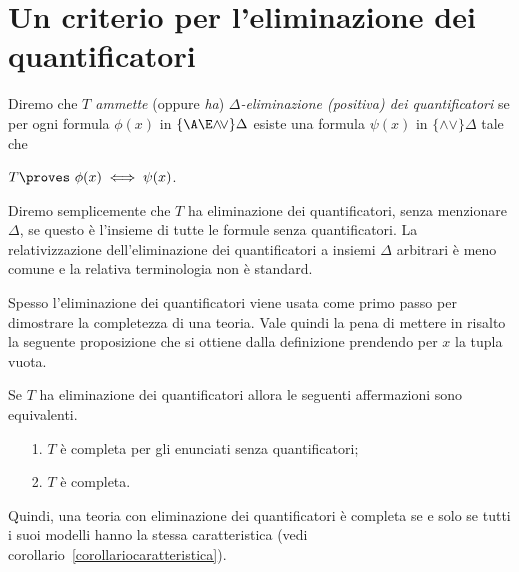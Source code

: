 \section{Un criterio per l'eliminazione dei quantificatori}
\label{eliminazionequantificatoricriterio}

Diremo che \emph{$T$ ammette\/} (oppure \emph{ha\/}) \emph{$\Delta$-eliminazione (positiva) dei quantificatori\/} se per ogni formula $\phi(x)$ in $\{\A\E\mathord\wedge\!\mathord\vee\}\Delta$ esiste una formula $\psi(x)$ in $\{\mathord\wedge\!\mathord\vee\}\Delta$ tale che

\hfil$\displaystyle T\proves\ \phi(x)\iff\psi(x)$.

Diremo semplicemente che $T$ ha eliminazione dei quantificatori, senza menzionare $\Delta$, se questo \`e l'insieme di tutte le formule senza quantificatori. La relativizzazione dell'eliminazione dei quantificatori a insiemi $\Delta$ arbitrari \`e meno comune e la relativa terminologia non \`e standard.

Spesso l'eliminazione dei quantificatori viene usata come primo passo per dimostrare la completezza di una teoria. Vale quindi la pena di mettere in risalto la seguente proposizione che si ottiene dalla definizione prendendo per $x$ la tupla vuota.

\begin{remark}
Se $T$ ha eliminazione dei quantificatori allora le seguenti affermazioni sono equivalenti. 
\begin{itemize}
\item[1.] $T$ \`e completa per gli enunciati senza quantificatori;
\item[2.] $T$ \`e completa.
\end{itemize}
Quindi, una teoria con eliminazione dei quantificatori \`e completa se e solo se tutti i suoi modelli hanno la stessa caratteristica (vedi  corollario~\ref{corollariocaratteristica}).\QED
\end{remark}


